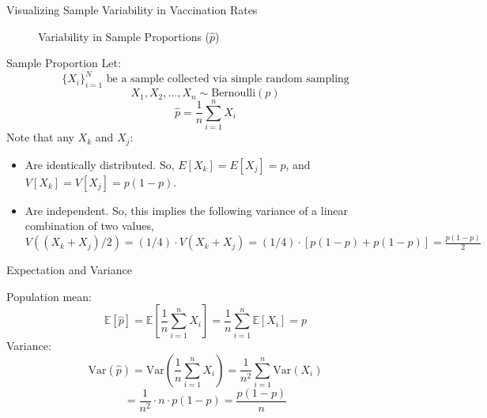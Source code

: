 \documentclass[handout]{beamer} %
\begin{document}
\begin{frame}{Visualizing Sample Variability in Vaccination Rates}
    \begin{figure}
        \centering
        \caption{Variability in Sample Proportions (\( \hat{p} \))}
    \end{figure}
\end{frame}

\begin{frame}{Sample Proportion}
Let:
\[ \{ X_i\}_{i=1}^{N} \text{ be a sample collected via simple random sampling}\]
\[
X_1, X_2, \dots, X_n \sim \text{Bernoulli}(p)
\]
\[
\hat{p} = \frac{1}{n} \sum_{i=1}^n X_i
\]
Note that any $X_k$ and $X_j$:
\begin{itemize}
    \item Are identically distributed. So, $E[X_k]=E[X_j]=p$, and $V[X_k]=V[X_j]=p(1-p)$.
    \item Are independent. So, this implies the following variance of a linear combination of two values, $V((X_k + X_j)/2) = (1/4)\cdot V(X_k+X_j) = (1/4)\cdot [p(1-p) + p(1-p)] = \frac{p(1-p)}{2}$
    
\end{itemize}
\end{frame}

\begin{frame}{Expectation and Variance}

Population mean:
\[
\mathbb{E}[\hat{p}] 
= \mathbb{E}\left[\frac{1}{n} \sum_{i=1}^n X_i\right]
= \frac{1}{n} \sum_{i=1}^n \mathbb{E}[X_i]
= p
\]
Variance:
\[
\text{Var}(\hat{p}) 
= \text{Var}\left(\frac{1}{n} \sum_{i=1}^n X_i\right)
= \frac{1}{n^2} \sum_{i=1}^n \text{Var}(X_i)
\]
\[
= \frac{1}{n^2} \cdot n \cdot p(1 - p)
= \frac{p(1 - p)}{n}
\]
\end{frame}
\end{document}
